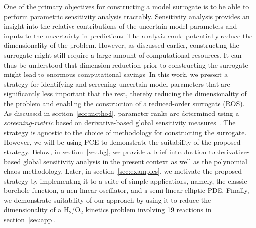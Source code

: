 One of the primary objectives for constructing a model surrogate is to be able to perform 
parametric sensitivity analysis tractably. Sensitivity analysis provides an insight into the
relative contributions of the uncertain model parameters and inputs to the uncertainty in
predictions. The analysis could potentially reduce the dimensionality of the problem.
However, as discussed earlier, constructing the surrogate might still require a large amount
of computational resources. It can thus be understood that dimension reduction prior to
constructing the surrogate might lead to enormous computational savings. In this work,
we present a strategy for identifying and screening uncertain model parameters that 
are significantly less important that the rest, thereby reducing the dimensionality of the
problem and enabling the construction of a reduced-order surrogate (ROS). As discussed in
section~\ref{sec:method}, parameter ranks are determined using a \textit{screening-metric}
based on derivative-based global sensitivity 
measures~\cite{Sobol:2009,Sobol:2010,Lamboni:2013,Kucherenko:2009,Kucherenko:2016}. 
The strategy is agnostic to the choice of methodology for constructing the surrogate. However, 
we will be using PCE to demonstrate the suitability of the proposed strategy. Below, in 
section~\ref{sec:bg}, we provide a brief introduction to derivative-based global sensitivity analysis
in the present context as well as the polynomial chaos methodology. Later, in section~\ref{sec:examples},
we motivate the proposed strategy by implementing it to a suite of simple applications, namely, the 
classic borehole function, a non-linear oscillator, and a semi-linear elliptic PDE. Finally, we demonstrate
suitability of our approach by using it to reduce the dimensionality of a H$_2$/O$_2$ kinetics problem
involving 19 reactions in section~\ref{sec:app}. 





